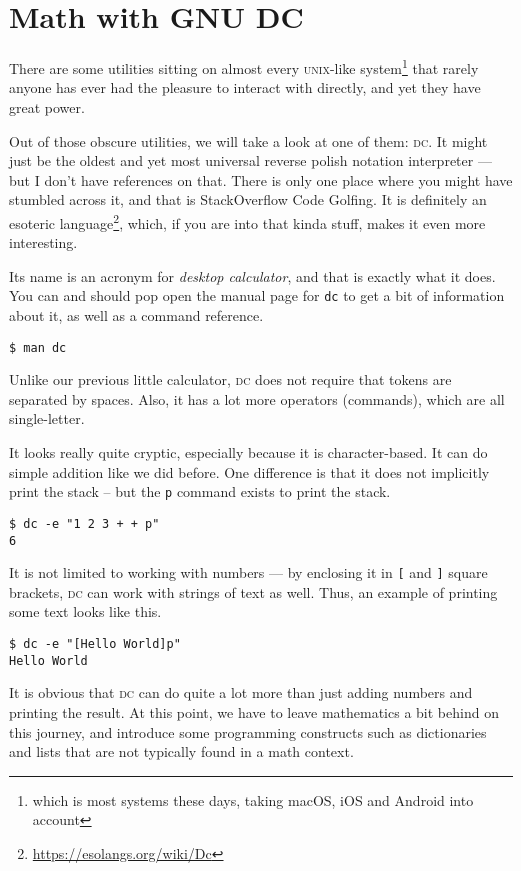 \documentclass[a4paper,twocolumn]{article}
\begin{document}
\section{Math with GNU DC}

There are some utilities sitting on almost every \textsc{unix}-like system\footnote{which is most systems these days, taking macOS, iOS and Android into account} that rarely anyone has ever had the pleasure to interact with directly, and yet they have great power.

Out of those obscure utilities, we will take a look at one of them: \textsc{dc}. It might just be the oldest and yet most universal reverse polish notation interpreter — but I don't have references on that. There is only one place where you might have stumbled across it, and that is StackOverflow Code Golfing. It is definitely an esoteric language\footnote{\url{https://esolangs.org/wiki/Dc}}, which, if you are into that kinda stuff, makes it even more interesting.

 Its name is an acronym for \emph{desktop calculator}, and that is exactly what it does. You can and should pop open the manual page for \verb|dc| to get a bit of information about it, as well as a command reference.

\begin{verbatim}
$ man dc
\end{verbatim}

Unlike our previous little calculator, \textsc{dc} does not require that tokens are separated by spaces. Also, it has a lot more operators (commands), which are all single-letter. 

It looks really quite cryptic, especially because it is character-based. It can do simple addition like we did before. One difference is that it does not implicitly print the stack -- but the \verb|p| command exists to print the stack.

\begin{verbatim}
$ dc -e "1 2 3 + + p"
6
\end{verbatim}

It is not limited to working with numbers — by enclosing it in \verb|[| and \verb|]| square brackets, \textsc{dc} can work with strings of text as well. Thus, an example of printing some text looks like this.

\begin{verbatim}
$ dc -e "[Hello World]p"
Hello World  
\end{verbatim}

It is obvious that \textsc{dc} can do quite a lot more than just adding numbers and printing the result. At this point, we have to leave mathematics a bit behind on this journey, and introduce some programming constructs such as dictionaries and lists that are not typically found in a math context.
\end{document}
